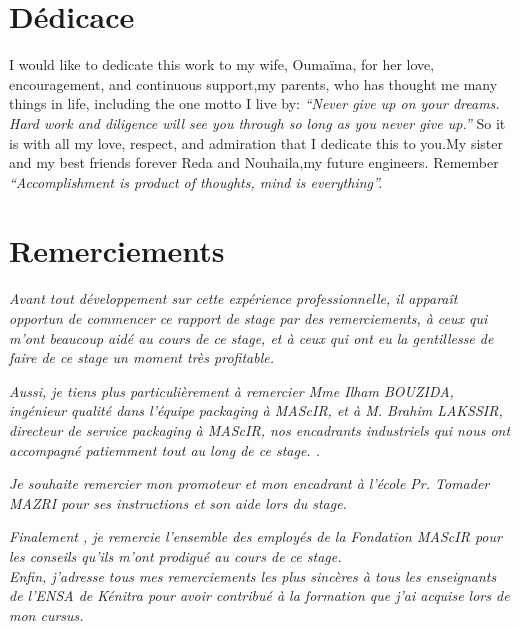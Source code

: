 \documentclass[11pt, a4paper, twoside]{book}
\author{Réalisé par : \\ Otmane BOUAYAD \vspace*{1truecm} \\ Encadré par : \\
Mme Ilham BOUZIDA : Encadrante professionnelle\\ 
Pr Tomader MAZRI : Encadrante académique\\
}
\date{(Du 15 Février au 30 Juin  2016)}
\begin{document}
\maketitle
\pagestyle{plain}
\frenchspacing
\chapter*{Dédicace}

I would like to dedicate this work to my wife, Oumaïma, for her love, encouragement, and continuous support,my parents, who has thought me many things in life, including the one motto I live by: 
\emph{“Never give up on your dreams. Hard work and diligence will see you through so long as you never give up.”}
 So it is with all my love, respect, and admiration that I dedicate this to you.My sister and my best friends forever Reda and Nouhaila,my future engineers. Remember
\emph{“Accomplishment is product of thoughts, mind is everything”.}

\chapter*{Remerciements}
\emph{
Avant tout développement sur cette expérience professionnelle, il apparaît opportun 
de commencer ce rapport de stage par des remerciements, à ceux qui  m'ont beaucoup 
aidé au cours de ce stage, et à ceux qui ont eu la gentillesse de faire de ce stage un 
moment très profitable.\\}

\emph{
Aussi, je tiens plus particulièrement à remercier Mme Ilham
BOUZIDA, ingénieur qualité dans l’équipe packaging à MAScIR, et à M. Brahim LAKSSIR, directeur de service packaging à MAScIR, nos encadrants industriels qui nous ont accompagné patiemment tout au long de ce stage.
.\\ }


\emph{Je souhaite remercier mon promoteur et mon encadrant à l'école Pr. Tomader MAZRI pour ses instructions et son aide lors du stage.\\}


\emph{
Finalement , je remercie l'ensemble des employés de la Fondation MAScIR pour les conseils qu’ils m'ont prodigué au cours de ce stage.
}\\


\emph{Enfin, j’adresse tous mes remerciements les plus sincères à tous les enseignants de l’ENSA de Kénitra pour avoir contribué à la formation que j’ai acquise lors de mon cursus.}
\tableofcontents
\end{document}
